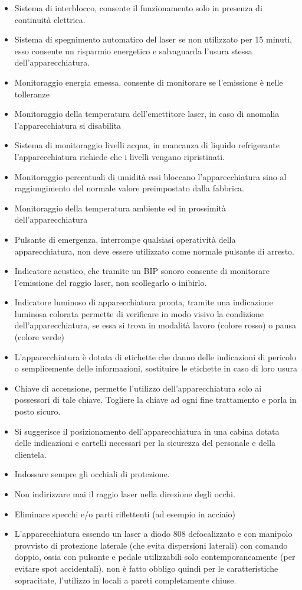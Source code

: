 \documentclass[10pt]{article}
\begin{document}
\begin{itemize}
  \item Sistema di interblocco, consente il funzionamento solo in presenza di continuità elettrica.
  \item Sistema di spegnimento automatico del laser se non utilizzato per 15 minuti, esso consente un risparmio energetico e salvaguarda l'usura stessa dell'apparecchiatura.
  \item Monitoraggio energia emessa, consente di monitorare se l'emissione è nelle tolleranze
  \item Monitoraggio della temperatura dell'emettitore laser, in caso di anomalia l'apparecchiatura si disabilita
  \item Sistema di monitoraggio livelli acqua, in mancanza di liquido refrigerante l'apparecchiatura richiede che i livelli vengano ripristinati.
  \item Monitoraggio percentuali di umidità essi bloccano l'apparecchiatura sino al raggiungimento del normale valore preimpostato dalla fabbrica.
  \item Monitoraggio della temperatura ambiente ed in prossimità dell'apparecchiatura
  \item Pulsante di emergenza, interrompe qualsiasi operatività della apparecchiatura, non deve essere utilizzato come normale pulsante di arresto.
  \item Indicatore acustico, che tramite un BIP sonoro consente di monitorare l'emissione del raggio laser, non scollegarlo o inibirlo.
  \item Indicatore luminoso di apparecchiatura pronta, tramite una indicazione luminosa colorata permette di verificare in modo visivo la condizione dell'apparecchiatura, se essa si trova in modalità lavoro (colore rosso) o pausa (colore verde)
  \item L’apparecchiatura è dotata di etichette che danno delle indicazioni di pericolo o semplicemente delle informazioni, sostituire le etichette in caso di loro usura
  \item Chiave di accensione, permette l'utilizzo dell'apparecchiatura solo ai possessori di tale chiave. Togliere la chiave ad ogni fine trattamento e porla in posto sicuro.
  \item Si suggerisce il posizionamento dell’apparecchiatura in una cabina dotata delle indicazioni e cartelli necessari per la sicurezza del personale e della clientela.
  \item Indossare sempre gli occhiali di protezione.
  \item Non indirizzare mai il raggio laser nella direzione degli occhi.
  \item Eliminare specchi e/o parti riflettenti (ad esempio in acciaio)
  \item L'apparecchiatura essendo un laser a diodo 808 defocalizzato e con manipolo provvisto di protezione laterale (che evita dispersioni laterali) con comando doppio, ossia con pulsante e pedale utilizzabili solo contemporaneamente (per evitare spot accidentali), non è fatto obbligo quindi per le caratteristiche sopracitate, l'utilizzo in locali a pareti completamente chiuse.
\end{itemize}
\end{document}
